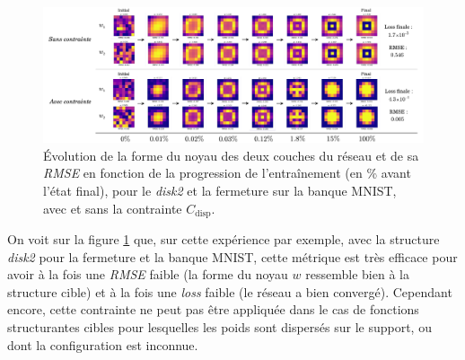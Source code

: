 
\vspace{0.4mm}
\begin{figure}[htp]
  \begin{center}
    \includegraphics[width=1.00\linewidth]{parts/3-contributions/C-contraintes_geometriques/figures/k_disp.pdf}
    \vspace{-4.0mm}
    \caption{ \centering Évolution de la forme du noyau des deux couches du réseau et de sa \textit{RMSE} en fonction de la progression de l'entraînement (en \% avant l'état final), pour le \textit{disk2} et la fermeture sur la banque MNIST, avec et sans la contrainte $C_\text{disp}$.}
    \label{fig:c_disp}
  \end{center}
\end{figure}

\vspace{-1.6mm}
\noindent On voit sur la figure \ref{fig:c_disp} que, sur cette expérience par exemple, avec la structure \textit{disk2} pour la fermeture et la banque MNIST, cette métrique est très efficace pour avoir à la fois une \textit{RMSE} faible (la forme du noyau $w$ ressemble bien à la structure cible) et à la fois une \textit{loss} faible (le réseau a bien convergé).
Cependant encore, cette contrainte ne peut pas être appliquée dans le cas de fonctions structurantes cibles pour lesquelles les poids sont dispersés sur le support, ou dont la configuration est inconnue.



\newpage

